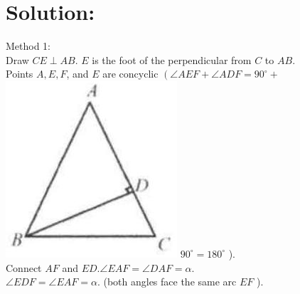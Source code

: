 \documentclass[10pt]{article}
\begin{document}
\section*{Solution:}
Method 1:\\
Draw \(C E \perp A B\). \(E\) is the foot of the perpendicular from \(C\) to \(A B\).\\
Points \(A, E, F\), and \(E\) are concyclic \(\left(\angle A E F+\angle A D F=90^{\circ}+\right.\)\\
\includegraphics[max width=\textwidth]{2025_04_17_97bc1f7e44d93c271a88g-194(2)} \(90^{\circ}=180^{\circ}\) ).\\
Connect \(A F\) and \(E D . \angle E A F=\angle D A F=\alpha\).\\
\(\angle E D F=\angle E A F=\alpha\). (both angles face the same arc \(E F\) ).
\end{document}
